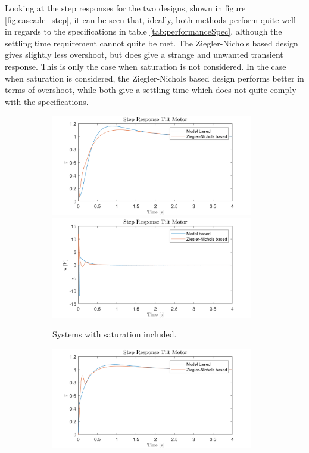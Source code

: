 \documentclass[../../main.tex]{subfiles}
\begin{document}
Looking at the step responses for the two designs, shown in figure \ref{fig:cascade_step}, it can be seen that, ideally, both methods perform quite well in regards to the specifications in table \ref{tab:performanceSpec}, although the settling time requirement cannot quite be met. The Ziegler-Nichols based design gives slightly less overshoot, but does give a strange and unwanted transient response. This is only the case when saturation is not considered. In the case when saturation is considered, the Ziegler-Nichols based design performs better in terms of overshoot, while both give a settling time which does not quite comply with the specifications.

\begin{figure}[h]
\begin{subfigure}{0.48\textwidth}
    \includegraphics[width = 0.97\textwidth]{Sections/System_Design/Images/cascade_step_y_sat.png}
    \includegraphics[width = 0.97\textwidth]{Sections/System_Design/Images/cascade_step_u_sat.png}
    \caption{Systems with saturation included.}
    \label{fig:RL_cascade_PP}
\end{subfigure}\quad
\begin{subfigure}{0.48\textwidth}
    \includegraphics[width = 0.97\textwidth]{Sections/System_Design/Images/cascade_step_y_NoSat.png}

\end{subfigure}
\end{figure}
\end{document}
